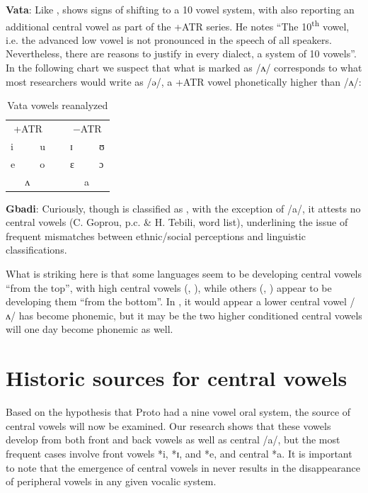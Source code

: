 \documentclass[output=paper,newtxmath,modfonts,nonflat,draft]{langsci/langscibook}
\begin{document}
\textbf{Vata}: Like ,  shows signs of shifting to a 10 vowel system, with \citet[70]{Kaye1980} also reporting an additional central vowel as part of the +ATR series. He notes “The 10\textsuperscript{th} vowel, i.e. the advanced low vowel is not pronounced in the speech of all  speakers.  Nevertheless, there are reasons to justify in every  dialect, a system of 10 vowels”. In the following chart we suspect that what is marked as /ʌ/ corresponds to what most  researchers would write as /ə/, a  +ATR vowel phonetically higher than /ʌ/:


\begin{table}
\caption{Vata vowels reanalyzed}	
\label{tab:zogbo:15}
\begin{tabular}{lllllll}
\multicolumn{3}{c}{+ATR} && \multicolumn{3}{c}{−ATR}\\ 
i  &&  u  &~&  ɪ  &&  ʊ\\

e  &&  o  &&  ɛ  &&  ɔ\\

& ʌ   &&&&     a \\
	\end{tabular}
\end{table}

{\noindent\textbf{Gbadi}}: Curiously, though  is classified as , with the exception of /a/, it attests no central vowels (C. Goprou, p.c. \& H. Tebili, word list), underlining the issue of frequent mismatches between ethnic/social perceptions and linguistic classifications. 

What is striking here is that some languages seem to be developing central vowels “from the top”, with high central vowels (,  ), while others (, ) appear to be developing them “from the bottom”.  In , it would appear a lower central vowel /ʌ/ has become phonemic, but it may be the two higher conditioned central vowels will one day become phonemic as well. 

\section{Historic sources for central vowels}\label{sec:zogbo:3}

Based on the hypothesis that Proto  had a nine vowel oral system, the source of central vowels will now be examined.  Our research shows that these vowels develop from both front and back vowels as well as central /a/, but the most frequent cases involve front vowels *i, *ɪ, and *e, and central *a.  It is important to note that the emergence of central vowels in  never results in the disappearance of peripheral vowels in any given vocalic system.  
\end{document}
